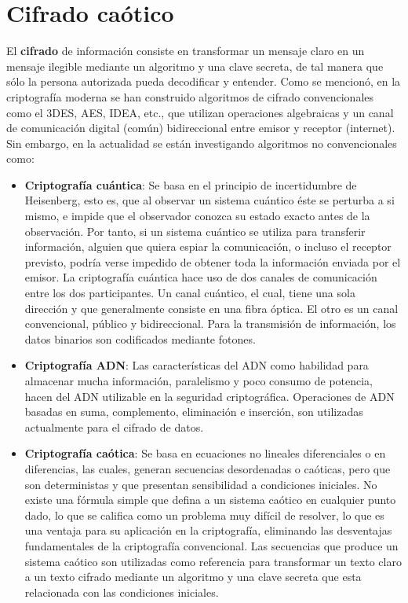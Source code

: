 \section{Cifrado caótico}
El \textbf{cifrado} de información consiste en transformar un mensaje claro en un mensaje ilegible mediante un algoritmo y una clave secreta, de tal manera que sólo la persona autorizada pueda decodificar y entender. Como se mencionó, en la criptografía moderna se han construido algoritmos de cifrado convencionales como el 3DES, AES, IDEA, etc., que utilizan operaciones algebraicas y un canal de comunicación digital (común) bidireccional entre emisor y receptor (internet). Sin embargo, en la actualidad se están investigando algoritmos no convencionales como:
\begin{itemize}
\item \textbf{Criptografía cuántica}: Se basa en el principio de incertidumbre de Heisenberg, esto es, que al observar un sistema cuántico éste se perturba a si mismo, e impide que el observador conozca su estado exacto antes de la observación. Por tanto, si un sistema cuántico se utiliza para transferir información, alguien que quiera espiar la comunicación, o incluso el receptor previsto, podría verse impedido de obtener toda la información enviada por el emisor. La criptografía cuántica hace uso de dos canales de comunicación entre los dos participantes. Un canal cuántico, el cual, tiene una sola dirección y que generalmente consiste en una fibra óptica. El otro es un canal convencional, público y bidireccional. Para la transmisión de información, los datos binarios son codificados mediante fotones.
\item \textbf{Criptografía ADN}: Las características del ADN como habilidad para almacenar mucha información,   paralelismo y poco consumo de potencia, hacen del ADN utilizable en la seguridad criptográfica. Operaciones de ADN basadas en suma, complemento, eliminación e inserción, son utilizadas actualmente para el cifrado de datos.   
\item \textbf{Criptografía caótica}: Se basa en ecuaciones no lineales diferenciales o en diferencias, las cuales, generan secuencias desordenadas o caóticas, pero que son deterministas y que presentan sensibilidad a condiciones iniciales. No existe una fórmula simple que defina a un sistema caótico en cualquier punto dado, lo que se califica como un problema muy difícil de resolver, lo que es una ventaja para su aplicación en la criptografía, eliminando las desventajas fundamentales de la criptografía convencional. Las secuencias que produce un sistema caótico son utilizadas como referencia para transformar un texto claro a un texto cifrado mediante un algoritmo y una clave secreta que esta relacionada con las condiciones iniciales. \\
\end{itemize}


